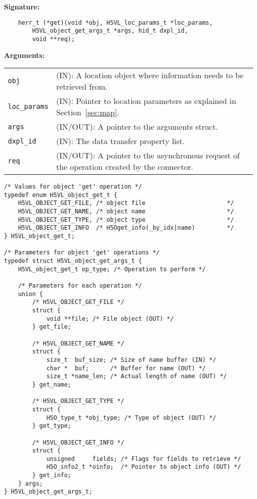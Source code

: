 \begin{mdframed}[style=bgbox]
\textbf{Signature:}
\begin{lstlisting}
    herr_t (*get)(void *obj, H5VL_loc_params_t *loc_params, 
        H5VL_object_get_args_t *args, hid_t dxpl_id, 
        void **req);
\end{lstlisting}

\textbf{Arguments:}\\
\begin{tabular}{l p{13.5cm}}
  \texttt{obj} & (IN): A location object where information needs to be
  retrieved from.\\
  \texttt{loc\_params} & (IN): Pointer to location parameters as
  explained in Section~\ref{sec:map}.\\
  \texttt{args} & (IN/OUT): A pointer to the arguments struct.\\
  \texttt{dxpl\_id} & (IN): The data transfer property list.\\
  \texttt{req} & (IN/OUT): A pointer to the asynchronous request of the
  operation created by the connector.\\
\end{tabular}
\end{mdframed}

\begin{lstlisting}
/* Values for object 'get' operation */
typedef enum H5VL_object_get_t {
    H5VL_OBJECT_GET_FILE, /* object file                       */
    H5VL_OBJECT_GET_NAME, /* object name                       */
    H5VL_OBJECT_GET_TYPE, /* object type                       */
    H5VL_OBJECT_GET_INFO  /* H5Oget_info(_by_idx|name)         */
} H5VL_object_get_t;

/* Parameters for object 'get' operations */
typedef struct H5VL_object_get_args_t {
    H5VL_object_get_t op_type; /* Operation to perform */

    /* Parameters for each operation */
    union {
        /* H5VL_OBJECT_GET_FILE */
        struct {
            void **file; /* File object (OUT) */
        } get_file;

        /* H5VL_OBJECT_GET_NAME */
        struct {
            size_t  buf_size; /* Size of name buffer (IN) */
            char *  buf;      /* Buffer for name (OUT) */
            size_t *name_len; /* Actual length of name (OUT) */
        } get_name;

        /* H5VL_OBJECT_GET_TYPE */
        struct {
            H5O_type_t *obj_type; /* Type of object (OUT) */
        } get_type;

        /* H5VL_OBJECT_GET_INFO */
        struct {
            unsigned     fields; /* Flags for fields to retrieve */
            H5O_info2_t *oinfo;  /* Pointer to object info (OUT) */
        } get_info;
    } args;
} H5VL_object_get_args_t;
\end{lstlisting}

